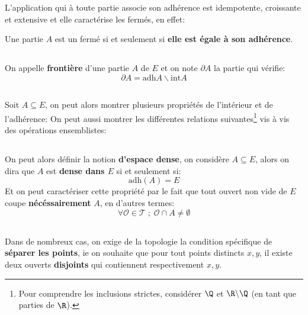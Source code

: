 L'application qui à toute partie associe son adhérence est idempotente, croissante et extensive et elle caractérise les fermés, en effet:
\begin{center}
   Une partie \(A\) est un fermé si et seulement si \textbf{elle est égale à son adhérence}.
\end{center}
\subsection*{}
On appelle \textbf{frontière} d'une partie \(A\) de \(E\) et on note \(\partial A\) la partie qui vérifie:
\[
   \partial A = \text{adh}{A} \backslash \text{int}{A}
\]
\pagebreak
\subsection*{}
Soit \(A \subseteq E\), on peut alors montrer plusieurs propriétés de l'intérieur et de l'adhérence:
On peut aussi montrer les différentes relations suivantes\footnote[1]{Pour comprendre les inclusions strictes, considérer \(\Q\) et \(\R \backslash \Q\) (en tant que parties de \(\R\)).} vis à vis des opérations ensemblistes:
\subsection*{}
On peut alors définir la notion \textbf{d'espace dense}, on considère \(A \subseteq E\), alors on dira que \(A\) est \textbf{dense dans \(E\)} si et seulement si:
\[
   \text{adh}(A) = E
\]
Et on peut caractériser cette propriété par le fait que tout ouvert non vide de \(E\) coupe \textbf{nécéssairement} \(A\), en d'autres termes:
\[
   \forall \mathcal{O} \in \mathcal{T} \; ; \; \mathcal{O} \cap A \neq \emptyset
\]
\subsection*{}
Dans de nombreux cas, on exige de la topologie la condition spécifique de \textbf{séparer les points}, ie on souhaite que pour tout points distincts \(x, y\), il existe deux ouverts \textbf{disjoints} qui contiennent respectivement \(x, y\).\<

